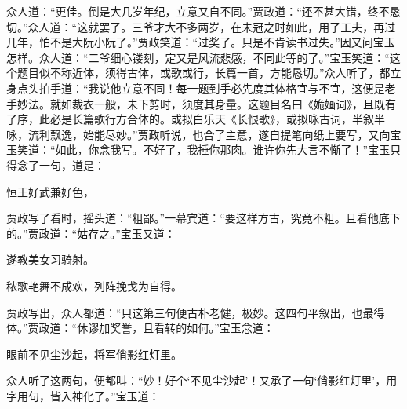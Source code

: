 \begin{parag}
    众人道：“更佳。倒是大几岁年纪，立意又自不同。”贾政道：“还不甚大错，终不恳切。”众人道：“这就罢了。三爷才大不多两岁，在未冠之时如此，用了工夫，再过几年，怕不是大阮小阮了。”贾政笑道：“过奖了。只是不肯读书过失。”因又问宝玉怎样。众人道：“二爷细心镂刻，定又是风流悲感，不同此等的了。”宝玉笑道：“这个题目似不称近体，须得古体，或歌或行，长篇一首，方能恳切。”众人听了，都立身点头拍手道：“我说他立意不同！每一题到手必先度其体格宜与不宜，这便是老手妙法。就如裁衣一般，未下剪时，须度其身量。这题目名曰《姽婳词》，且既有了序，此必是长篇歌行方合体的。或拟白乐天《长恨歌》，或拟咏古词，半叙半咏，流利飘逸，始能尽妙。”贾政听说，也合了主意，遂自提笔向纸上要写，又向宝玉笑道：“如此，你念我写。不好了，我捶你那肉。谁许你先大言不惭了！”宝玉只得念了一句，道是：
\end{parag}


\begin{poem}
    \begin{pl}
        恒王好武兼好色，
    \end{pl}
\end{poem}


\begin{parag}
    贾政写了看时，摇头道：“粗鄙。”一幕宾道：“要这样方古，究竟不粗。且看他底下的。”贾政道：“姑存之。”宝玉又道：
\end{parag}


\begin{poem}
    \begin{pl}
        遂教美女习骑射。
    \end{pl}
    \begin{pl}
        秾歌艳舞不成欢，列阵挽戈为自得。
    \end{pl}

\end{poem}


\begin{parag}
    贾政写出，众人都道：“只这第三句便古朴老健，极妙。这四句平叙出，也最得体。”贾政道：“休谬加奖誉，且看转的如何。”宝玉念道：
\end{parag}


\begin{poem}
    \begin{pl}
        眼前不见尘沙起，将军俏影红灯里。
    \end{pl}

\end{poem}


\begin{parag}
    众人听了这两句，便都叫：“妙！好个‘不见尘沙起’！又承了一句‘俏影红灯里’，用字用句，皆入神化了。”宝玉道：
\end{parag}



